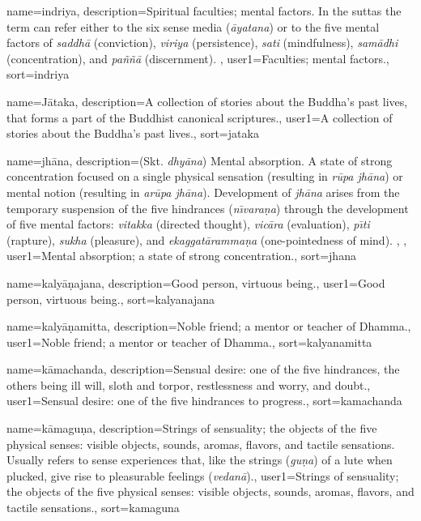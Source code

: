 {
name={indriya},
description={Spiritual faculties; mental factors. In the suttas the term can refer either to the six sense media (\textit{\=ayatana}) or to the five mental factors of \textit{saddh\=a} (conviction), \textit{viriya} (persistence), \textit{sati} (mindfulness), \textit{sam\=adhi} (concentration), and \textit{pa\~n\~n\=a} (discernment). \protect \seepre %
\protect {}%
\protect \seepost %
},
user1={Faculties; mental factors.},
sort={indriya}
}

{
name={J\=ataka},
description={A collection of stories about the Buddha's past lives, that forms a part of the Buddhist canonical scriptures.},
user1={A collection of stories about the Buddha's past lives.},
sort={jataka}
}

{
name={jh\=ana},
description={(Skt. \textit{dhy\=ana}) Mental absorption. A state of strong concentration focused on a single physical sensation (resulting in \textit{r\=upa jh\=ana}) or mental notion (resulting in \textit{ar\=upa jh\=ana}). Development of \textit{jh\=ana} arises from the temporary suspension of the five hindrances (\textit{n\={\i}vara\d{n}a}) through the development of five mental factors: \textit{vitakka} (directed thought), \textit{vic\=ara} (evaluation), \textit{p\={\i}ti} (rapture), \textit{sukha} (pleasure), and \textit{ekaggat\=aramma\d{n}a} (one-pointedness of mind). \protect \seepre %
\protect {}, \protect {}%
\protect \seepost %
},
user1={Mental absorption; a state of strong concentration.},
sort={jhana}
}

{
name=kaly\=a\d{n}ajana,
description={Good person, virtuous being.},
user1={Good person, virtuous being.},
sort={kalyanajana}
}

{
name={kaly\=a\d{n}amitta},
description={Noble friend; a mentor or teacher of Dhamma.},
user1={Noble friend; a mentor or teacher of Dhamma.},
sort={kalyanamitta}
}

{
name=k\=amachanda,
description={Sensual desire: one of the five hindrances, the others being ill will, sloth and torpor, restlessness and worry, and doubt.},
user1={Sensual desire: one of the five hindrances to progress.},
sort={kamachanda}
}

{
name={k\=amagu\d{n}a},
description={Strings of sensuality; the objects of the five physical senses: visible objects, sounds, aromas, flavors, and tactile sensations. Usually refers to sense experiences that, like the strings (\textit{gu\d{n}a}) of a lute when plucked, give rise to pleasurable feelings (\textit{vedan\=a}).},
user1={Strings of sensuality; the objects of the five physical senses: visible objects, sounds, aromas, flavors, and tactile sensations.},
sort={kamaguna}
}

